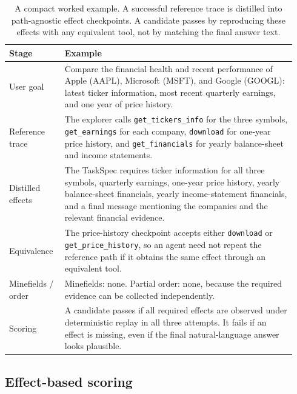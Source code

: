 \begin{table}[t]
\centering
\small
\setlength{\tabcolsep}{4pt}
\renewcommand{\arraystretch}{1.05}
\caption{A compact worked example. A successful reference trace is distilled
into path-agnostic effect checkpoints. A candidate passes by reproducing these
effects with any equivalent tool, not by matching the final answer text.}
\label{tab:worked-example}
\begin{tabular}{p{0.18\linewidth}p{0.76\linewidth}}
\toprule
\textbf{Stage} & \textbf{Example} \\
\midrule

User goal &
Compare the financial health and recent performance of Apple (AAPL),
Microsoft (MSFT), and Google (GOOGL): latest ticker information, most recent
quarterly earnings, and one year of price history. \\

Reference trace &
The explorer calls \texttt{get\_tickers\_info} for the three symbols,
\texttt{get\_earnings} for each company, \texttt{download} for one-year price
history, and \texttt{get\_financials} for yearly balance-sheet and income
statements. \\

Distilled effects &
The TaskSpec requires ticker information for all three symbols, quarterly
earnings, one-year price history, yearly balance-sheet financials, yearly
income-statement financials, and a final message mentioning the companies and
the relevant financial evidence. \\

Equivalence &
The price-history checkpoint accepts either \texttt{download} or
\texttt{get\_price\_history}, so an agent need not repeat the reference path
if it obtains the same effect through an equivalent tool. \\

Minefields / order &
Minefields: none. Partial order: none, because the required evidence can be
collected independently. \\

Scoring &
A candidate passes if all required effects are observed under deterministic
replay in all three attempts. It fails if an effect is missing, even if the
final natural-language answer looks plausible. \\

\bottomrule
\end{tabular}
\end{table}

\subsection{Effect-based scoring}
\label{sec:benchmark:eval}

